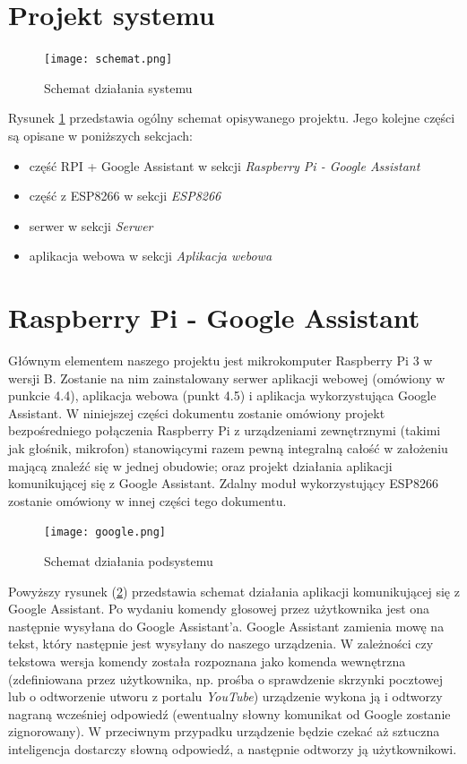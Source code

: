 \section{Projekt systemu}

	\begin{figure}[H]
	\texttt{[image: schemat.png]}
	\caption{Schemat działania systemu}
	\label{img:system}
	\end{figure}
	
	
Rysunek \ref{img:system} przedstawia ogólny schemat opisywanego projektu.
Jego kolejne części są opisane w poniższych sekcjach:
\begin{itemize}
\item część RPI + Google Assistant w sekcji \textit{Raspberry Pi - Google Assistant}
\item część z ESP8266 w sekcji \textit{ESP8266}
\item serwer w sekcji \textit{Serwer}
\item aplikacja webowa w sekcji \textit{Aplikacja webowa}
\end{itemize}


\section{Raspberry Pi - Google Assistant}

Głównym elementem naszego projektu jest mikrokomputer Raspberry Pi 3 w wersji B. Zostanie na nim zainstalowany serwer aplikacji webowej (omówiony w punkcie 4.4), aplikacja webowa (punkt 4.5) i aplikacja wykorzystująca Google Assistant. W niniejszej części dokumentu zostanie omówiony projekt bezpośredniego połączenia Raspberry Pi z urządzeniami zewnętrznymi (takimi jak głośnik, mikrofon) stanowiącymi razem pewną integralną całość w założeniu mającą znaleźć się w jednej obudowie; oraz projekt działania aplikacji komunikującej się z Google Assistant. Zdalny moduł wykorzystujący ESP8266 zostanie omówiony w innej części tego dokumentu.
	
	\begin{figure}[H]
	\texttt{[image: google.png]}
	\caption{Schemat działania podsystemu}
	\label{img:google}
	\end{figure}

Powyższy rysunek (\ref{img:google}) przedstawia schemat działania aplikacji komunikującej się z Google Assistant. Po wydaniu komendy głosowej przez użytkownika jest ona następnie wysyłana do Google Assistant'a. Google Assistant zamienia mowę na tekst, który następnie jest wysyłany do naszego urządzenia. W zależności czy tekstowa wersja komendy została rozpoznana jako komenda wewnętrzna (zdefiniowana przez użytkownika, np. prośba o sprawdzenie skrzynki pocztowej lub o odtworzenie utworu z portalu \emph{YouTube}) urządzenie wykona ją i odtworzy nagraną wcześniej odpowiedź (ewentualny słowny komunikat od Google zostanie zignorowany). W przeciwnym przypadku urządzenie będzie czekać aż sztuczna inteligencja dostarczy słowną odpowiedź, a następnie odtworzy ją użytkownikowi.

